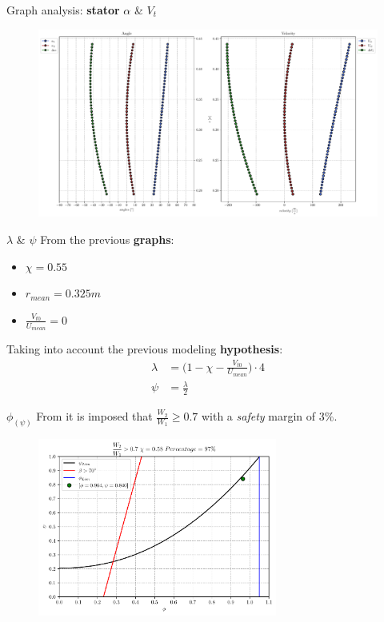 {	\begin{frame}{Graph analysis: \textbf{stator} $\alpha$ \& $V_{t}$}
		\begin{figure}
			\centering
			\includegraphics[width=\textwidth]{figures/alphaAngles.pdf}
		\end{figure}
	\end{frame}
	}

	\begin{frame}{$\lambda$ \& $\psi$}
		From the previous \textbf{graphs}:
		\begin{itemize}
			\item $\chi = 0.55$
			\item $r_{mean} = 0.325 m$
			\item $\frac{V_{t0}}{U_{mean}} = 0$
		\end{itemize}
		Taking into account the previous modeling \textbf{hypothesis}:
		\begin{align}
			\lambda & = \Bigg( 1 - \chi - \frac{V_{t0}}{U_{mean}} \Bigg) \cdot 4 \nonumber \\
			\psi    & = \frac{\lambda}{2} \nonumber
		\end{align}
	\end{frame}
	
	\begin{frame}{$\phi_{(\psi)}$}
		From \cite[Sec. 10.4]{axial2004} it is imposed that $\frac{W_2}{W_1} \geq 0.7$ with a \textit{safety} margin of $3 \%$.  
		\begin{figure}
			\centering
			\includegraphics[width=0.7\textwidth]{figures/stagePerf.pdf}
		\end{figure}
	\end{frame}

